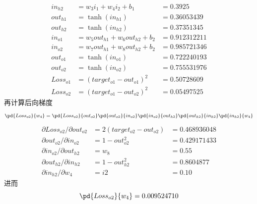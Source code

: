 \documentclass[a4paper, 11pt]{article}
\newcommand{\ipd}[2]{\partial #1/\partial #2}
\begin{document}
\begin{answer}
\begin{itemize}
\[\begin{array}{lll}
        in_{h2} &= w_3 i_1 + w_4 i_2 + b_1 &= 0.3925\\
        out_{h1} &= \tanh(in_{h1}) &=0.36053439\\
        out_{h2} &= \tanh(in_{h2}) &=0.37351345\\
        in_{o1} &= w_5 out_{h1} + w_6 out_{h2} +b_2 &= 0.912312211\\
        in_{o2} &= w_7 out_{h1} + w_8 out_{h2} +b_2 &= 0.985721346\\
        out_{o1} &= \tanh(in_{o1}) &= 0.722240193\\
        out_{o2} &= \tanh(in_{o2}) &= 0.755531976\\
        Loss_{o1} &= (target_{o1}-out_{o1})^2 &=0.50728609\\
        Loss_{o2} &= (target_{o1}-out_{o2})^2 &=0.05497525
    \end{array}\]
    再计算后向梯度
    \[\pd{Loss_{o2}}{w_4}=\pd{Loss_{o2}}{out_{o2}}\pd{out_{o2}}{in_{o2}}\pd{in_{o2}}{out_{h2}}\pd{out_{h2}}{in_{h2}}\pd{in_{h2}}{w_4}\]
    \[\begin{array}{llll}
        \ipd{Loss_{o2}}{out_{o2}}&=2(target_{o2}-out_{o2})&=0.468936048\\
        \ipd{out_{o2}}{in_{o2}}&=1-out_{o2}^2&=0.429171433\\
        \ipd{in_{o2}}{out_{h2}}&=w_8&=0.55\\
        \ipd{out_{h2}}{in_{h2}}&=1-out_{h2}^2&=0.8604877\\
        \ipd{in_{h2}}{w_4}&=i2&=0.10
    \end{array}\]
    进而
    \[\pd{Loss_{o2}}{w_4}=0.009524710\]
\end{itemize}
\end{answer}
\begin{flushleft}
\end{flushleft}
\end{document}
